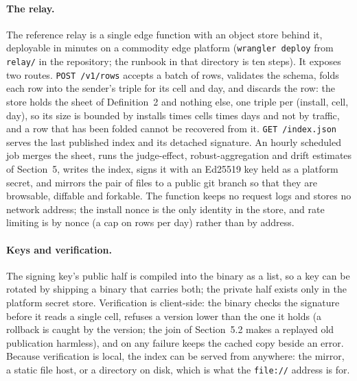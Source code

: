 \documentclass[10pt,a4paper]{article}
\newcommand{\code}[1]{\texttt{#1}}
\theoremstyle{definition}
\theoremstyle{remark}
\begin{document}
\paragraph{The relay.}
The reference relay is a single edge function with an object store behind it, deployable in minutes on a commodity edge platform (\code{wrangler deploy} from \code{relay/} in the repository; the runbook in that directory is ten steps). It exposes two routes. \code{POST /v1/rows} accepts a batch of rows, validates the schema, folds each row into the sender's triple for its cell and day, and discards the row: the store holds the sheet of Definition~2 and nothing else, one triple per (install, cell, day), so its size is bounded by installs times cells times days and not by traffic, and a row that has been folded cannot be recovered from it. \code{GET /index.json} serves the last published index and its detached signature. An hourly scheduled job merges the sheet, runs the judge-effect, robust-aggregation and drift estimates of Section~5, writes the index, signs it with an Ed25519 key held as a platform secret, and mirrors the pair of files to a public git branch so that they are browsable, diffable and forkable. The function keeps no request logs and stores no network address; the install nonce is the only identity in the store, and rate limiting is by nonce (a cap on rows per day) rather than by address.

\paragraph{Keys and verification.}
The signing key's public half is compiled into the binary as a list, so a key can be rotated by shipping a binary that carries both; the private half exists only in the platform secret store. Verification is client-side: the binary checks the signature before it reads a single cell, refuses a version lower than the one it holds (a rollback is caught by the version; the join of Section~5.2 makes a replayed old publication harmless), and on any failure keeps the cached copy beside an error. Because verification is local, the index can be served from anywhere: the mirror, a static file host, or a directory on disk, which is what the \code{file://} address is for.
\end{document}
